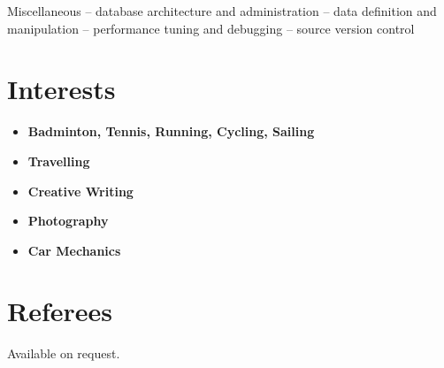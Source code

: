 \documentclass{article}
\begin{document}
\begin{skillgroup}{Miscellaneous}%
	 -- database architecture and administration
	 -- data definition and manipulation
	 -- performance tuning and debugging
	 -- source version control
\end{skillgroup}


\section{Interests}

\begin{itemize}
\item \textbf{Badminton, Tennis, Running, Cycling, Sailing} 
\item \textbf{Travelling}
\item \textbf{Creative Writing} 
\item \textbf{Photography} 
\item \textbf{Car Mechanics} 
\end{itemize}


\section{Referees}

Available on request.
\end{document}
